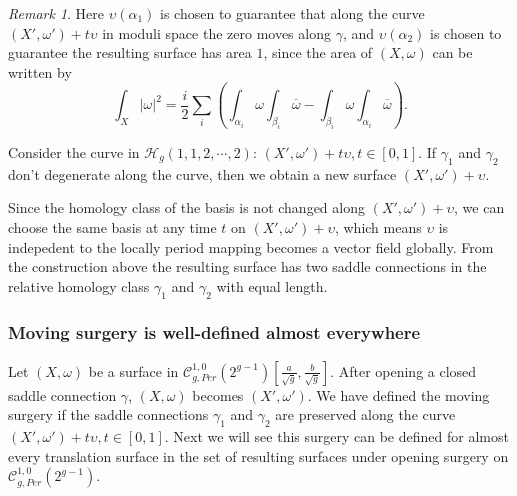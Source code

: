 \documentclass[12pt]{amsart} %
\theoremstyle{definition}
\theoremstyle{remark}
\newtheorem{remark}[theorem]{Remark}
\numberwithin{equation}{section}
\renewcommand\H{{\mathcal H}}
\begin{document}
\begin{remark}\label{explain}
Here $\upsilon(\alpha_1)$ is chosen to guarantee that along the curve $(X',\omega')+t\upsilon$ in moduli space the zero moves along $\gamma$, 
and $\upsilon(\alpha_2)$ is chosen to guarantee the resulting surface has area $1$, since the area of $(X,\omega)$ can be written by
$$\int_X|\omega|^2=\frac{i}{2}\sum_i(\int_{\alpha_i}\omega \int_{\beta_i}\overline{\omega}-\int_{\beta_i}\omega \int_{\alpha_i}\overline{\omega}).$$
\end{remark}


Consider the curve in $\H_g(1,1,2,\cdots,2)$: $(X', \omega')+t\upsilon, t\in [0,1]$. 
If $\gamma_1$ and $\gamma_2$ don't degenerate along the curve, then we obtain a new surface $(X',\omega')+\upsilon$.

Since the homology class of the basis is not changed along $(X',\omega')+\upsilon$,
we can choose the same basis at any time $t$ on $(X',\omega')+\upsilon$, which means
$\upsilon$ is indepedent to the locally period mapping becomes a vector field globally.
From the construction above the resulting surface has two saddle connections 
in the relative homology class $\gamma_1$ and $\gamma_2$ with equal length.


\subsubsection{Moving surgery is well-defined almost everywhere}\label{F_2}
Let $(X,\omega)$ be a surface in $ \mathcal{C}^{1,0}_{g,Per}(2^{g-1})[\frac{a}{\sqrt{g}},\frac{b}{\sqrt{g}}]$.
After opening a closed saddle connection $\gamma$, $(X,\omega)$ becomes $(X',\omega')$.
We have defined the moving surgery if the saddle connections $\gamma_1$ and $\gamma_2$ are preserved along the curve $(X',\omega')+t\upsilon, t\in [0,1]$.
Next we will see this surgery can be defined for almost every translation surface in the set of resulting surfaces under opening surgery on $\mathcal{C}^{1,0}_{g,Per}(2^{g-1})$.
\end{document}
